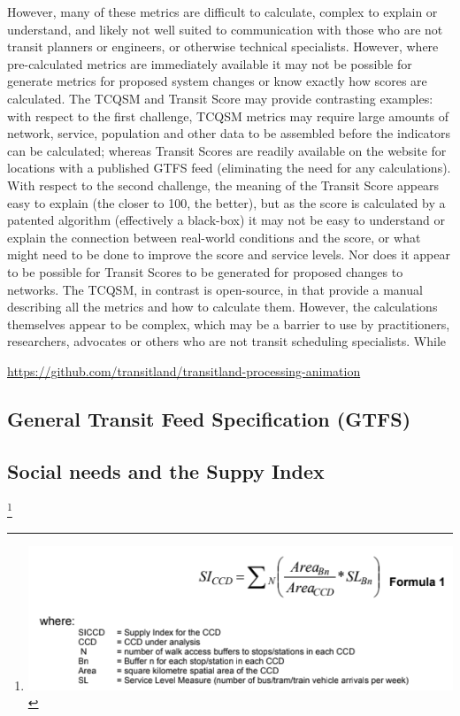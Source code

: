 \documentclass[numbered]{trbunofficial}
\begin{document}
However, many of these metrics are difficult to calculate, complex to
explain or understand, and likely not well suited to communication with
those who are not transit planners or engineers, or otherwise technical
specialists. However, where pre-calculated metrics are immediately
available it may not be possible for generate metrics for proposed
system changes or know exactly how scores are calculated. The TCQSM and
Transit Score may provide contrasting examples: with respect to the
first challenge, TCQSM metrics may require large amounts of network,
service, population and other data to be assembled before the indicators
can be calculated; whereas Transit Scores are readily available on the
\citet{WalkScore:2023tg} website for locations with a published GTFS
feed (eliminating the need for any calculations). With respect to the
second challenge, the meaning of the Transit Score appears easy to
explain (the closer to 100, the better), but as the score is calculated
by a patented algorithm (effectively a black-box) it may not be easy to
understand or explain the connection between real-world conditions and
the score, or what might need to be done to improve the score and
service levels. Nor does it appear to be possible for Transit Scores to
be generated for proposed changes to networks. The TCQSM, in contrast is
open-source, in that \citet{TCQSM:2013} provide a manual describing all
the metrics and how to calculate them. However, the calculations
themselves appear to be complex, which may be a barrier to use by
practitioners, researchers, advocates or others who are not transit
scheduling specialists. While \citet{Wong:2013aa}

\url{https://github.com/transitland/transitland-processing-animation}

\hypertarget{general-transit-feed-specification-gtfs}{%
\subsection{General Transit Feed Specification
(GTFS)}\label{general-transit-feed-specification-gtfs}}

\hypertarget{social-needs-and-the-suppy-index}{%
\subsection{Social needs and the Suppy
Index}\label{social-needs-and-the-suppy-index}}

\footnote{\includegraphics{Supply_index.png}}
\end{document}

